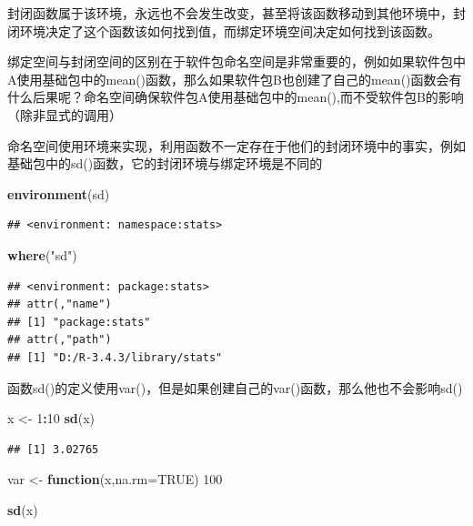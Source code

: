 \documentclass[]{book}
\newenvironment{Shaded}{\begin{snugshade}}{\end{snugshade}}
\newcommand{\KeywordTok}[1]{\textcolor[rgb]{0.13,0.29,0.53}{\textbf{#1}}}
\newcommand{\DataTypeTok}[1]{\textcolor[rgb]{0.13,0.29,0.53}{#1}}
\newcommand{\DecValTok}[1]{\textcolor[rgb]{0.00,0.00,0.81}{#1}}
\newcommand{\StringTok}[1]{\textcolor[rgb]{0.31,0.60,0.02}{#1}}
\newcommand{\OtherTok}[1]{\textcolor[rgb]{0.56,0.35,0.01}{#1}}
\newcommand{\ControlFlowTok}[1]{\textcolor[rgb]{0.13,0.29,0.53}{\textbf{#1}}}
\newcommand{\OperatorTok}[1]{\textcolor[rgb]{0.81,0.36,0.00}{\textbf{#1}}}
\newcommand{\NormalTok}[1]{#1}
\begin{document}
封闭函数属于该环境，永远也不会发生改变，甚至将该函数移动到其他环境中，封闭环境决定了这个函数该如何找到值，而绑定环境空间决定如何找到该函数。

绑定空间与封闭空间的区别在于软件包命名空间是非常重要的，例如如果软件包中A使用基础包中的mean()函数，那么如果软件包B也创建了自己的mean()函数会有什么后果呢？命名空间确保软件包A使用基础包中的mean(),而不受软件包B的影响（除非显式的调用）

命名空间使用环境来实现，利用函数不一定存在于他们的封闭环境中的事实，例如基础包中的sd()函数，它的封闭环境与绑定环境是不同的

\begin{Shaded}
\begin{Highlighting}[]
\KeywordTok{environment}\NormalTok{(sd)}
\end{Highlighting}
\end{Shaded}

\begin{verbatim}
## <environment: namespace:stats>
\end{verbatim}

\begin{Shaded}
\begin{Highlighting}[]
\KeywordTok{where}\NormalTok{(}\StringTok{"sd"}\NormalTok{)}
\end{Highlighting}
\end{Shaded}

\begin{verbatim}
## <environment: package:stats>
## attr(,"name")
## [1] "package:stats"
## attr(,"path")
## [1] "D:/R-3.4.3/library/stats"
\end{verbatim}

函数sd()的定义使用var()，但是如果创建自己的var()函数，那么他也不会影响sd()

\begin{Shaded}
\begin{Highlighting}[]
\NormalTok{x <-}\StringTok{ }\DecValTok{1}\OperatorTok{:}\DecValTok{10}
\KeywordTok{sd}\NormalTok{(x)}
\end{Highlighting}
\end{Shaded}

\begin{verbatim}
## [1] 3.02765
\end{verbatim}

\begin{Shaded}
\begin{Highlighting}[]
\NormalTok{var <-}\StringTok{ }\ControlFlowTok{function}\NormalTok{(x,}\DataTypeTok{na.rm=}\OtherTok{TRUE}\NormalTok{) }\DecValTok{100}

\KeywordTok{sd}\NormalTok{(x)}
\end{Highlighting}
\end{Shaded}
\end{document}
